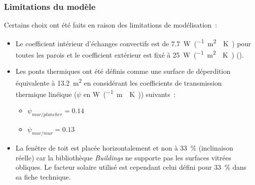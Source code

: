 \subsubsection{Limitations du modèle} %
\label{ssub:limitations_du_modele}
Certains choix ont été faits en raison des limitations de modélisation~:
\begin{itemize}
    \item Le coefficient intérieur d’échanges convectifs est de \SI{7.7}{\watt\per(\meter\squared\period\kelvin)}
          pour toutes les parois et le coefficient extérieur
          est fixé à \SI{25}{\watt\per(\meter\squared\period\kelvin)} (\textcite{NFENISO6946}).
    \item Les ponts thermiques ont été définis comme une surface de déperdition
          équivalente à \SI{13.2}{\meter\squared} en considérant les coefficients de transmission
          thermique linéique ($\psi$ en \si{\watt\per(\metre\period\kelvin)}) suivants~:
          \begin{itemize}
              \item $\psi_{mur / plancher} = \num{0.14}$
              \item $\psi_{mur / mur} = \num{0.13}$
          \end{itemize}
    \item La fenêtre de toit est placée horizontalement et non à \SI{33}{\percent}
          (inclinaison réelle) car la bibliothèque \textit{Buildings} ne supporte pas les
          surfaces vitrées obliques. Le facteur solaire utilisé est cependant celui défini
          pour \SI{33}{\percent} dans sa fiche technique.
\end{itemize}


